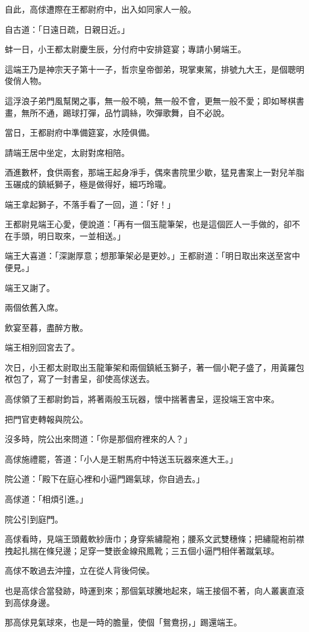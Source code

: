 \documentclass[11pt,a4paper]{article}
\begin{document}
自此，高俅遭際在王都尉府中，出入如同家人一般。

自古道：「日遠日疏，日親日近。」

蚌一日，小王都太尉慶生辰，分付府中安排筵宴；專請小舅端王。

這端王乃是神宗天子第十一子，哲宗皇帝御弟，現掌東駕，排號九大王，是個聰明俊俏人物。

這浮浪子弟門風幫閑之事，無一般不曉，無一般不會，更無一般不愛；即如琴棋書畫，無所不通，踢球打彈，品竹調絲，吹彈歌舞，自不必說。

當日，王都尉府中準備筵宴，水陸俱備。

請端王居中坐定，太尉對席相陪。

酒進數杯，食供兩套，那端王起身凈手，偶來書院里少歇，猛見書案上一對兒羊脂玉碾成的鎮紙獅子，極是做得好，細巧玲瓏。

端王拿起獅子，不落手看了一回，道：「好！」

王都尉見端王心愛，便說道：「再有一個玉龍筆架，也是這個匠人一手做的，卻不在手頭，明日取來，一並相送。」

端王大喜道：「深謝厚意；想那筆架必是更妙。」王都尉道：「明日取出來送至宮中便見。」

端王又謝了。

兩個依舊入席。

飲宴至暮，盡醉方散。

端王相別回宮去了。

次日，小王都太尉取出玉龍筆架和兩個鎮紙玉獅子，著一個小靶子盛了，用黃羅包袱包了，寫了一封書呈，卻使高俅送去。

高俅領了王都尉鈞旨，將著兩般玉玩器，懷中揣著書呈，逕投端王宮中來。

把門官吏轉報與院公。

沒多時，院公出來問道：「你是那個府裡來的人？」

高俅施禮罷，答道：「小人是王駙馬府中特送玉玩器來進大王。」

院公道：「殿下在庭心裡和小逼門踢氣球，你自過去。」

高俅道：「相煩引進。」

院公引到庭門。

高俅看時，見端王頭戴軟紗唐巾；身穿紫繡龍袍；腰系文武雙穗條；把繡龍袍前襟拽起扎揣在條兒邊；足穿一雙嵌金線飛鳳靴；三五個小逼門相伴著蹴氣球。

高俅不敢過去沖撞，立在從人背後伺侯。

也是高俅合當發跡，時運到來；那個氣球騰地起來，端王接個不著，向人叢裏直滾到高俅身邊。

那高俅見氣球來，也是一時的膽量，使個「鴛鴦拐，」踢還端王。
\end{document}

